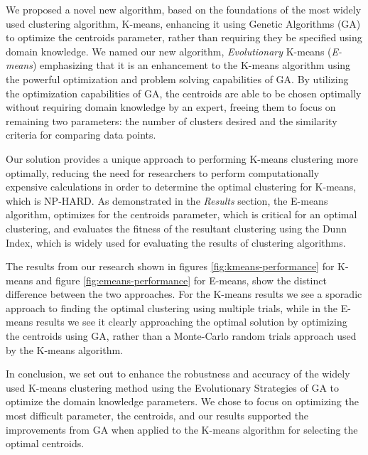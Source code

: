 \documentclass{article}
\begin{document}
We proposed a novel new algorithm, based on the foundations of the most widely used clustering algorithm, K-means, enhancing it using Genetic Algorithms (GA) to optimize the centroids parameter, rather than requiring they be specified using domain knowledge. We named our new algorithm, \emph{Evolutionary} K-means (\emph{E-means}) emphasizing that it is an enhancement to the K-means algorithm using the powerful optimization and problem solving capabilities of GA. By utilizing the optimization capabilities of GA, the centroids are able to be chosen optimally without requiring domain knowledge by an expert, freeing them to focus on remaining two parameters: the number of clusters desired and the similarity criteria for comparing data points.

Our solution provides a unique approach to performing K-means clustering more optimally, reducing the need for researchers to perform computationally expensive calculations in order to determine the optimal clustering for K-means, which is NP-HARD\cite{jain2010}. As demonstrated in the \emph{Results} section, the E-means algorithm, optimizes for the centroids parameter, which is critical for an optimal clustering, and evaluates the fitness of the resultant clustering using the Dunn Index\cite{dunn1973fuzzy}, which is widely used for evaluating the results of clustering algorithms.

The results from our research shown in figures \ref{fig:kmeans-performance} for K-means and figure \ref{fig:emeans-performance} for E-means, show the distinct difference between the two approaches. For the K-means results we see a sporadic approach to finding the optimal clustering using multiple trials, while in the E-means results we see it clearly approaching the optimal solution by optimizing the centroids using GA, rather than a Monte-Carlo random trials approach used by the K-means algorithm.

In conclusion, we set out to enhance the robustness and accuracy of the widely used K-means clustering method using the Evolutionary Strategies of GA to optimize the domain knowledge parameters. We chose to focus on optimizing the most difficult parameter, the centroids, and our results supported the improvements from GA when applied to the K-means algorithm for selecting the optimal centroids.




\end{document}
